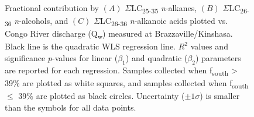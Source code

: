 \begin{figure}[p]
	\caption[Correlation between compound-class contribution and discharge]{Fractional contribution by $(A)$ $\Sigma$LC\textsubscript{25-35} \textit{n}-alkanes, $(B)$ $\Sigma$LC\textsubscript{26-36} \textit{n}-alcohols, and $(C)$ $\Sigma$LC\textsubscript{26-36} \textit{n}-alkanoic acids plotted vs. Congo River discharge (Q\textsubscript{w}) measured at Brazzaville/Kinshasa. Black line is the quadratic WLS regression line. $R^2$ values and significance $p$-values for linear ($\beta_1$) and quadratic ($\beta_2$) parameters are reported for each regression. Samples collected when f\textsubscript{south} > 39\% are plotted as white squares, and samples collected when f\textsubscript{south} $\leq$ 39\% are plotted as black circles. Uncertainty ($\pm 1 \sigma$) is smaller than the symbols for all data points.}
	\label{Ch4Fig:10} 
\end{figure}

